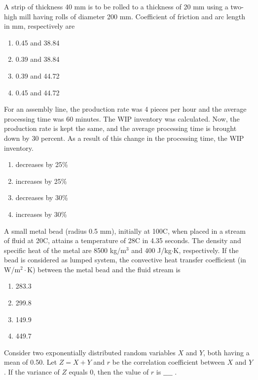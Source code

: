 \item A strip of thickness 40 mm is to be rolled to a thickness of 20 mm using a two-high mill having rolls of diameter 200 mm. Coefficient of friction and arc length in mm, respectively are
\begin{enumerate}
    \item 0.45 and 38.84
    \item 0.39 and 38.84
    \item 0.39 and 44.72
    \item 0.45 and 44.72 \\
\end{enumerate}
\item For an assembly line, the production rate was 4 pieces per hour and the average processing time was 60 minutes. The WIP inventory was calculated. Now, the production rate is kept the same, and the average processing time is brought down by 30 percent. As a result of this change in the processing time, the WIP inventory.
\begin{enumerate}
    \item decreases by 25\%
    \item increases by 25\%
    \item decreases by 30\%
    \item increases by 30\% \\
\end{enumerate}
\item A small metal bead (radius 0.5 mm), initially at 100\degree C, when placed in a stream of fluid at 20\degree C, attains a temperature of 28\degree C in 4.35 seconds. The density and specific heat of the metal are 8500 kg/$\text{m}^3$ and 400 J/kg$\cdot$K, respectively. If the bead is considered as lumped system, the convective heat transfer coefficient (in W/$\text{m}^2\cdot$K) between the metal bead and the fluid stream is
\begin{enumerate}
    \item 283.3
    \item 299.8
    \item 149.9
    \item 449.7 \\
\end{enumerate}
\item Consider two exponentially distributed random variables $X$ and $Y$, both having a mean of 0.50. Let $Z = X + Y$ and $r$ be the correlation coefficient between $X$ and $Y$. If the variance of $Z$ equals 0, then the
value of $r$ is $\_\_\_\_$ . \\
